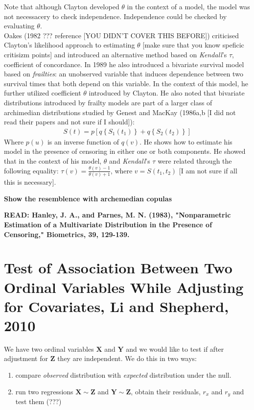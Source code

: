 \documentclass[]{article}
\begin{document}
Note that although Clayton developed $\theta$ in the context of a model, the model was not necessacery to check independence. Independence could be checked by evaluating $\theta$.\\
Oakes (1982 ??? reference [YOU DIDN'T COVER THIS BEFORE]) criticised Clayton's likelihood approach to estimating $\theta$ [make sure that you know speficic critisizm points] and introduced an alternative method based on \emph{Kendall}'s $\tau$, coefficient of concordance. In 1989 he also introduced a bivariate survival model based on \emph{frailties}: an unobserved variable that induces dependence between two survival times that both depend on this variable. In the context of this model, he further utilized coefficient $\theta$ introduced by Clayton. He also noted that bivariate distributions introduced by frailty models are part of a larger class of archimedian distributions studied by Genest and MacKay (1986a,b [I did not read their papers and not sure if I should]):
$$
\begin{aligned}
	S(t) = p\left[ q\left\{ S_1(t_1) \right\}  + q\left\{ S_2(t_2) \right\}  \right]
\end{aligned}
$$
Where $p(u)$ is an inverse function of $q(v)$. He shows how to estimate his model in the presence of censoring in either one or both components. He showed that in the context of his model, $\theta$ and \emph{Kendall}'s $\tau$ were related through the following equality: $\tau(v) = \frac{\theta(v)-1}{\theta(v)+1}$, where $v=S(t_1, t_2)$ [I am not sure if all this is necessary].

\textbf{Show the resemblence with archemedian copulas}

\textbf{READ: Hanley, J. A., and Parnes, M. N. (1983), "Nonparametric Estimation of a Multivariate Distribution in the Presence of Censoring," Biometrics, 39, 129-139.}


\section{Test of Association Between Two Ordinal Variables While Adjusting for Covariates, Li and Shepherd, 2010 \cite{li2010test}}
We have two ordinal variables $\pmb{X}$ and $\pmb{Y}$ and we would like to test if after adjustment for $\pmb{Z}$ they are independent. We do this in two ways:
\begin{enumerate}[1)]
	\item compare \emph{observed} distribution with \emph{expected} distribution under the null.
	\item run two regressions $\pmb{X\sim Z}$ and $\pmb{Y\sim Z}$, obtain their residuals, $r_x$ and $r_y$ and test them (???)
\end{enumerate}
\end{document}

